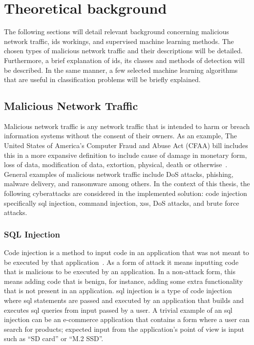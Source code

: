 \clearpage%


\chapter{Theoretical background}\label{ch:theoretical-background}

The following sections will detail relevant background concerning malicious network traffic, \gls{ids} workings, and supervised machine learning methods.
The chosen types of malicious network traffic and their descriptions will be detailed.
Furthermore, a brief explanation of \gls{ids}, its classes and methods of detection will be described.
In the same manner, a few selected machine learning algorithms that are useful in classification problems will be briefly explained.

\section{Malicious Network Traffic}\label{sec:malicious-network-traffic}

Malicious network traffic is any network traffic that is intended to harm or breach information systems without the consent of their owners.
As an example, The United States of America's Computer Fraud and Abuse Act (CFAA) bill includes this in a more expansive definition to include cause of damage in monetary form, loss of data, modification of data, extortion, physical, death or otherwise~\cite{code20201030}.
General examples of malicious network traffic include \gls{DoS} attacks, phishing, malware delivery, and ransomware among others.
In the context of this thesis, the following cyberattacks are considered in the implemented solution: code injection specifically \gls{sql} injection, command injection, \gls{xss}, \gls{DoS} attacks, and brute force attacks.

\subsection{SQL Injection}\label{subsec:sql-injection}

Code injection is a method to input code in an application that was not meant to be executed by that application~\cite{Mitropoulos2011}.
As a form of attack it means inputting code that is malicious to be executed by an application.
In a non-attack form, this means adding code that is benign, for instance, adding some extra functionality that is not present in an application.
\gls{sql} injection is a type of code injection where \gls{sql} statements are passed and executed by an application that builds and executes \gls{sql} queries from input passed by a user.
A trivial example of an \gls{sql} injection can be an e-commerce application that contains a form where a user can search for products;
expected input from the application's point of view is input such as ``SD card'' or ``M.2 SSD''.

